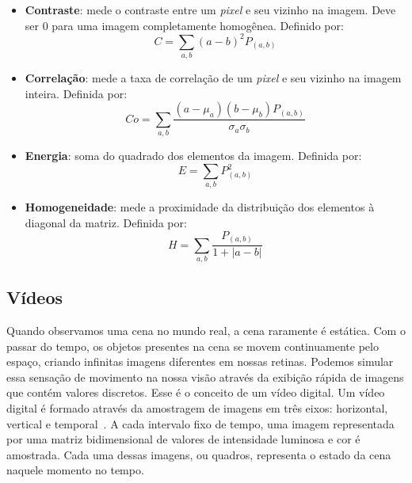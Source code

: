 \begin{itemize}

\item \textbf{Contraste}: mede o contraste entre um \textit{pixel} e seu vizinho na imagem. Deve ser 0 para uma imagem completamente homogênea. Definido por:
	\begin{equation}
		C = \sum_{a,b} (a-b)^{2}P_{(a,b)}
	\label{eq:Contraste}
	\end{equation}
	
\item \textbf{Correlação}: mede a taxa de correlação de um \textit{pixel} e seu vizinho na imagem inteira. Definida por:
	\begin{equation}
		Co = \sum_{a,b} \frac{(a - \mu_a)(b - \mu_b)P_{(a,b)}}{\sigma_a\sigma_b}
	\label{eq:Correlacao}
	\end{equation}
	
\item \textbf{Energia}: soma do quadrado dos elementos da imagem. Definida por:
	\begin{equation}
		E = \sum_{a,b} P_{(a,b)}^{2}
		\label{eq:Energia}
	\end{equation}
	
\item \textbf{Homogeneidade}: mede a proximidade da distribuição dos elementos à diagonal da matriz. Definida por:
	\begin{equation}
		H = \sum_{a,b} \frac{P_{(a,b)}}{1+|a-b|}
		\label{eq:Homo}
	\end{equation}

\end{itemize}


\subsection{Vídeos}\label{sec:video}


Quando observamos uma cena no mundo real, a cena raramente é estática. Com o passar do tempo, os objetos presentes na cena se movem continuamente pelo espaço, criando infinitas imagens diferentes em nossas retinas. Podemos simular essa sensação de movimento na nossa visão através da exibição rápida de imagens que contém valores discretos. Esse é o conceito de um vídeo digital. Um vídeo digital é formado através da amostragem de imagens	em três eixos: horizontal, vertical e temporal~\cite{LivroVideoDigital,bovik2010handbook}. A cada intervalo fixo de tempo, uma imagem representada por uma matriz bidimensional de valores de intensidade luminosa e cor é amostrada. Cada uma dessas imagens, ou quadros, representa o estado da cena naquele momento no tempo.

